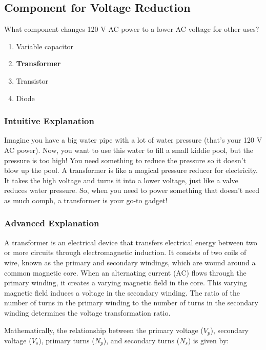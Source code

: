\subsection{Component for Voltage Reduction}
\label{T6D06}

\begin{tcolorbox}[colback=gray!10!white,colframe=black!75!black,title=T6D06]
What component changes 120 V AC power to a lower AC voltage for other uses?
\begin{enumerate}[label=\Alph*)]
    \item Variable capacitor
    \item \textbf{Transformer}
    \item Transistor
    \item Diode
\end{enumerate}
\end{tcolorbox}

\subsubsection{Intuitive Explanation}
Imagine you have a big water pipe with a lot of water pressure (that's your 120 V AC power). Now, you want to use this water to fill a small kiddie pool, but the pressure is too high! You need something to reduce the pressure so it doesn’t blow up the pool. A transformer is like a magical pressure reducer for electricity. It takes the high voltage and turns it into a lower voltage, just like a valve reduces water pressure. So, when you need to power something that doesn’t need as much oomph, a transformer is your go-to gadget!

\subsubsection{Advanced Explanation}
A transformer is an electrical device that transfers electrical energy between two or more circuits through electromagnetic induction. It consists of two coils of wire, known as the primary and secondary windings, which are wound around a common magnetic core. When an alternating current (AC) flows through the primary winding, it creates a varying magnetic field in the core. This varying magnetic field induces a voltage in the secondary winding. The ratio of the number of turns in the primary winding to the number of turns in the secondary winding determines the voltage transformation ratio.

Mathematically, the relationship between the primary voltage (\(V_p\)), secondary voltage (\(V_s\)), primary turns (\(N_p\)), and secondary turns (\(N_s\)) is given by:

